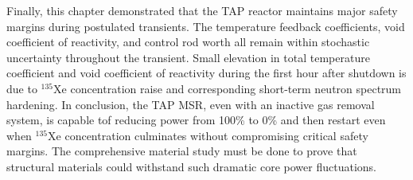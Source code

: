 Finally, this chapter demonstrated that the \gls{TAP} reactor maintains major 
safety margins during postulated transients. The temperature feedback 
coefficients, void coefficient of reactivity, and control rod worth all remain 
within stochastic uncertainty throughout the transient. Small elevation in 
total temperature coefficient and void coefficient of reactivity during the 
first hour after shutdown is due to $^{135}$Xe concentration raise and 
corresponding short-term neutron spectrum hardening. In conclusion, the 
\gls{TAP} \gls{MSR}, even with an inactive gas removal system, is capable tof 
reducing power from 100\% to 0\% and then restart even when $^{135}$Xe 
concentration culminates without compromising critical safety margins. 
The comprehensive material study must be done to prove that structural 
materials could withstand such dramatic core power fluctuations.





